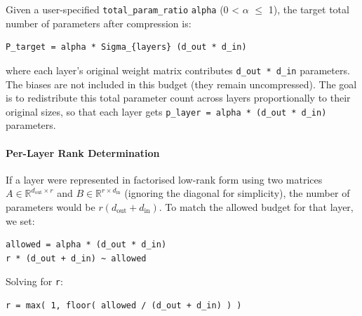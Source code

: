 Given a user-specified \texttt{total\_param\_ratio} \texttt{alpha} (0 < $\alpha$ $\le$ 1), the target total number of parameters after compression is:

\vspace{0.5em}
\begin{mdframed}[backgroundcolor=codebg, linecolor=codeframe, linewidth=1pt, roundcorner=4pt, innerleftmargin=2pt, innerrightmargin=5pt, innertopmargin=5pt, innerbottommargin=5pt]
\begin{lstlisting}
P_target = alpha * Sigma_{layers} (d_out * d_in)
\end{lstlisting}
\end{mdframed}
\vspace{0.5em}

where each layer's original weight matrix contributes \texttt{d\_out * d\_in} parameters. The biases are not included in this budget (they remain uncompressed). The goal is to redistribute this total parameter count across layers proportionally to their original sizes, so that each layer gets \texttt{p\_layer = alpha * (d\_out * d\_in)} parameters.

\paragraph{Per-Layer Rank Determination}

If a layer were represented in factorised low-rank form using two matrices $A \in \mathbb{R}^{d_{\text{out}} \times r}$ and $B \in \mathbb{R}^{r \times d_{\text{in}}}$ (ignoring the diagonal for simplicity), the number of parameters would be $r (d_{\text{out}} + d_{\text{in}})$. To match the allowed budget for that layer, we set:

\vspace{0.5em}
\begin{mdframed}[backgroundcolor=codebg, linecolor=codeframe, linewidth=1pt, roundcorner=4pt, innerleftmargin=2pt, innerrightmargin=5pt, innertopmargin=5pt, innerbottommargin=5pt]
\begin{lstlisting}
allowed = alpha * (d_out * d_in)
r * (d_out + d_in) ~ allowed
\end{lstlisting}
\end{mdframed}
\vspace{0.5em}

Solving for \texttt{r}:

\vspace{0.5em}
\begin{mdframed}[backgroundcolor=codebg, linecolor=codeframe, linewidth=1pt, roundcorner=4pt, innerleftmargin=2pt, innerrightmargin=5pt, innertopmargin=5pt, innerbottommargin=5pt]
\begin{lstlisting}
r = max( 1, floor( allowed / (d_out + d_in) ) )
\end{lstlisting}
\end{mdframed}
\vspace{0.5em}


